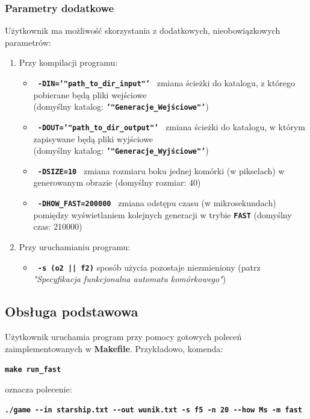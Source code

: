\documentclass[a4paper]{article}
\begin{document}
\subsubsection{Parametry dodatkowe}
\quad U\.zytkownik ma mo\.zliwo\'s\'c skorzystania z dodatkowych, nieobowi\k{a}zkowych parametr\'ow:
\begin{enumerate}
\item Przy kompilacji programu:
	\begin{itemize}
		\item \textbf{\texttt{ -DIN='"path\_to\_dir\_input"' }} zmiana \'scie\.zki do katalogu, z kt\'orego pobierane b\k{e}d\k{a} pliki wej\'sciowe 
			\\(domy\'slny katalog: \textbf{\texttt{'"Generacje\_Wej\'sciowe"'}})
		\item \textbf{\texttt{ -DOUT='"path\_to\_dir\_output"' }} zmiana \'scie\.zki do katalogu, w kt\'orym zapisywane b\k{e}d\k{a} pliki wyj\'sciowe
			\\(domy\'slny katalog: \textbf{\texttt{'"Generacje\_Wyj\'sciowe"'}})
		\item \textbf{\texttt{ -DSIZE=10 }} zmiana rozmiaru boku jednej kom\'orki (w pikselach) w generowanym obrazie (domy\'slny rozmiar: 40)
		\item \textbf{\texttt{ -DHOW\_FAST=200000 }} zmiana odst\k{e}pu czasu (w mikrosekundach) pomi\k{e}dzy wy\'swietlaniem kolejnych generacji w trybie \textbf{\texttt{FAST}} (domy\'slny czas: 210000)
	\end{itemize}
\item Przy uruchamianiu programu:
	\begin{itemize}
		\item \textbf{\texttt{ -s (o2 || f2)}} spos\'ob u\.zycia pozostaje niezmieniony (patrz \textit{"Specyfikacja funkcjonalna automatu kom\'orkowego"})
	\end{itemize}
\end{enumerate}




\subsection{Obs\l{}uga podstawowa}
\quad U\.zytkownik uruchamia program przy pomocy gotowych polece\'n zaimplementowanych w \textbf{Makefile}. Przyk\l{}adowo, komenda:
\begin{center}
	\textbf{\texttt{make run\_fast}}
\end{center}
oznacza polecenie:
\begin{center}
	\textbf{\texttt{./game -{}-in starship.txt -{}-out wunik.txt -s f5 -n 20 -{}-how Ms -m fast}}
\end{center}
\end{document}
